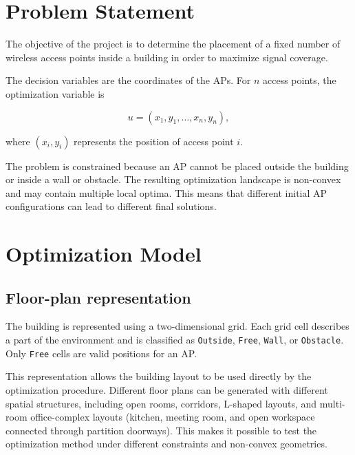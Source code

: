 \documentclass[11pt]{article}
\begin{document}
\section{Problem Statement}

The objective of the project is to determine the placement of a fixed
number of wireless access points inside a building in order to maximize
signal coverage.

The decision variables are the coordinates of the APs. For $n$ access
points, the optimization variable is

\[
u=(x_1,y_1,\ldots,x_n,y_n),
\]

where $(x_i,y_i)$ represents the position of access point $i$.

The problem is constrained because an AP cannot be placed outside the
building or inside a wall or obstacle. The resulting optimization
landscape is non-convex and may contain multiple local optima. This
means that different initial AP configurations can lead to different
final solutions.

\section{Optimization Model}

\subsection{Floor-plan representation}

The building is represented using a two-dimensional grid. Each grid
cell describes a part of the environment and is classified as
\texttt{Outside}, \texttt{Free}, \texttt{Wall}, or \texttt{Obstacle}.
Only \texttt{Free} cells are valid positions for an AP.

This representation allows the building layout to be used directly by
the optimization procedure. Different floor plans can be generated
with different spatial structures, including open rooms, corridors,
L-shaped layouts, and multi-room office-complex layouts (kitchen,
meeting room, and open workspace connected through partition
doorways). This makes it possible to test the optimization method
under different constraints and non-convex geometries.
\end{document}
